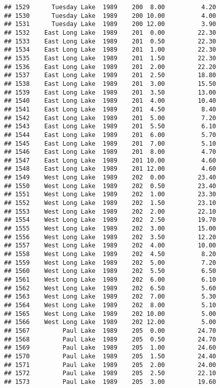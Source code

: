 \documentclass[
]{article}
\begin{document}
\begin{verbatim}
## 1529      Tuesday Lake  1989    200  8.00          4.20
## 1530      Tuesday Lake  1989    200 10.00          4.00
## 1531      Tuesday Lake  1989    200 12.00          3.90
## 1532    East Long Lake  1989    201  0.00         22.30
## 1533    East Long Lake  1989    201  0.50         22.30
## 1534    East Long Lake  1989    201  1.00         22.30
## 1535    East Long Lake  1989    201  1.50         22.30
## 1536    East Long Lake  1989    201  2.00         22.20
## 1537    East Long Lake  1989    201  2.50         18.80
## 1538    East Long Lake  1989    201  3.00         15.50
## 1539    East Long Lake  1989    201  3.50         13.00
## 1540    East Long Lake  1989    201  4.00         10.40
## 1541    East Long Lake  1989    201  4.50          8.40
## 1542    East Long Lake  1989    201  5.00          7.20
## 1543    East Long Lake  1989    201  5.50          6.10
## 1544    East Long Lake  1989    201  6.00          5.70
## 1545    East Long Lake  1989    201  7.00          5.10
## 1546    East Long Lake  1989    201  8.00          4.70
## 1547    East Long Lake  1989    201 10.00          4.60
## 1548    East Long Lake  1989    201 12.00          4.60
## 1549    West Long Lake  1989    202  0.00         23.40
## 1550    West Long Lake  1989    202  0.50         23.40
## 1551    West Long Lake  1989    202  1.00         23.30
## 1552    West Long Lake  1989    202  1.50         23.10
## 1553    West Long Lake  1989    202  2.00         22.10
## 1554    West Long Lake  1989    202  2.50         19.70
## 1555    West Long Lake  1989    202  3.00         15.00
## 1556    West Long Lake  1989    202  3.50         12.20
## 1557    West Long Lake  1989    202  4.00         10.00
## 1558    West Long Lake  1989    202  4.50          8.20
## 1559    West Long Lake  1989    202  5.00          7.20
## 1560    West Long Lake  1989    202  5.50          6.50
## 1561    West Long Lake  1989    202  6.00          6.10
## 1562    West Long Lake  1989    202  6.50          5.60
## 1563    West Long Lake  1989    202  7.00          5.30
## 1564    West Long Lake  1989    202  8.00          5.10
## 1565    West Long Lake  1989    202 10.00          5.00
## 1566    West Long Lake  1989    202 12.00          5.00
## 1567         Paul Lake  1989    205  0.00         24.70
## 1568         Paul Lake  1989    205  0.50         24.70
## 1569         Paul Lake  1989    205  1.00         24.60
## 1570         Paul Lake  1989    205  1.50         24.40
## 1571         Paul Lake  1989    205  2.00         24.00
## 1572         Paul Lake  1989    205  2.50         22.10
## 1573         Paul Lake  1989    205  3.00         19.60

\end{verbatim}
\end{document}

